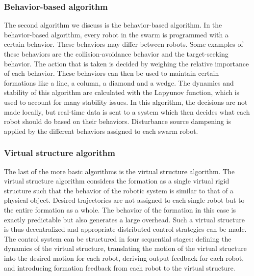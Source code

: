 \subsubsection{Behavior-based algorithm}
The second algorithm we discuss is the behavior-based algorithm.
In the behavior-based algorithm, every robot in the swarm is programmed with a certain behavior.
These behaviors may differ between robots.
Some examples of these behaviors are the collision-avoidance behavior and the target-seeking behavior.
The action that is taken is decided by weighing the relative importance of each behavior. \cite{consolini2008leader}
These behaviors can then be used to maintain certain formations like a line, a column, a diamond and a wedge. \cite{balch1998behavior}
The dynamics and stability of this algorithm are calculated with the Lapyunov function, which is used to account for many stability issues. \cite{lawton2003decentralized}
In this algorithm, the decisions are not made locally, but real-time data is sent to a system which then decides what each robot should do based on their behaviors.
Disturbance source dampening is applied by the different behaviors assigned to each swarm robot.

\subsubsection{Virtual structure algorithm}
The last of the more basic algorithms is the virtual structure algorithm.
The virtual structure algorithm considers the formation as a single virtual rigid structure such that the behavior of the robotic system is similar to that of a physical object.
Desired trajectories are not assigned to each single robot but to the entire formation as a whole.
The behavior of the formation in this case is exactly predictable but also generates a  large overhead. \cite{consolini2008leader}
Such a virtual structure is thus decentralized and appropriate distributed control strategies can be made. \cite{ren2004decentralized}
The control system can be structured in four sequential stages: defining the dynamics of the virtual structure,
translating the motion of the virtual structure into the desired motion for each robot,
deriving output feedback for each robot,
and introducing formation feedback from each robot to the virtual structure. \cite{do2007nonlinear}

